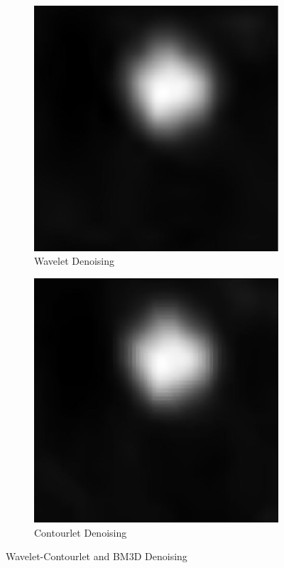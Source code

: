 \begin{figure}[h]
	\centering
	\begin{subfigure}{.5\textwidth}
		\centering
		\includegraphics[width=.8\linewidth]{fig/wavecon}
		\caption{Wavelet Denoising}
		\label{fig:sub1}
	\end{subfigure}%
	\begin{subfigure}{.5\textwidth}
		\centering
		\includegraphics[width=.8\linewidth]{fig/bm3d.jpg}
		\caption{Contourlet Denoising}
		\label{fig:sub2}
	\end{subfigure}
	\caption{Wavelet-Contourlet and BM3D Denoising}
	\label{fig:de2}
\end{figure}


